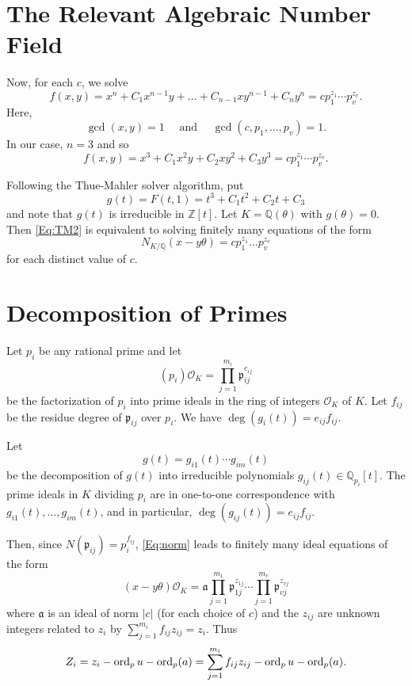 \section{The Relevant Algebraic Number Field}
Now, for each $c$, we solve
\[f(x,y) = x^n + C_1 x^{n-1}y + \dots + C_{n-1}xy^{n-1} + C_ny^n = c p_1^{z_1} \cdots p_v^{z_v}.\]
Here, 
\[\gcd(x,y) = 1 \quad \text{ and } \quad \gcd(c,p_1, \dots, p_v) = 1.\]
In our case, $n = 3$ and so
\[f(x,y) = x^3 + C_1 x^{2}y + C_2xy^2 + C_3y^3 = c p_1^{z_1} \cdots p_v^{z_v}.\]

Following the Thue-Mahler solver algorithm, put
\[g(t) = F(t,1) = t^3 + C_1t^2 + C_2t + C_3\]
and note that $g(t)$ is irreducible in $\mathbb{Z}[t]$. Let $K = \mathbb{Q}(\theta)$ with $g(\theta) = 0$. Then \eqref{Eq:TM2} is equivalent to solving finitely many equations of the form
\begin{equation} \label{Eq:norm}
N_{K/\mathbb{Q}}(x-y\theta) = cp_1^{z_1}\dots p_v^{z_v}
\end{equation}
for each distinct value of $c$. 


\section{Decomposition of Primes}

Let $p_i$ be any rational prime and let 
\[(p_i)\mathcal{O}_K = \prod_{j = 1}^{m_i} \mathfrak{p}_{ij}^{e_{ij}}\]
be the factorization of $p_i$ into prime ideals in the ring of integers $\mathcal{O}_K$ of $K$. Let $f_{ij}$ be the residue degree of $\mathfrak{p}_{ij}$ over $p_i$. We have $\deg(g_i(t)) = e_{ij}f_{ij}$.

Let
\[g(t) = g_{i1}(t)\cdots g_{im}(t)\]
be the decomposition of $g(t)$ into irreducible polynomials $g_{ij}(t) \in \mathbb{Q}_{p_i}[t]$. The prime ideals in $K$ dividing $p_i$ are in one-to-one correspondence with $g_{i1}(t), \dots, g_{im}(t)$, and in particular, $\deg(g_{ij}(t)) = e_{ij}f_{ij}$. 

Then, since $N(\mathfrak{p}_{ij}) = p_i^{f_{ij}}$, \eqref{Eq:norm} leads to finitely many ideal equations of the form
\begin{equation} \label{Eq:ideals}
(x-y\theta)\mathcal{O}_K = \mathfrak{a} \prod_{j = 1}^{m_1} \mathfrak{p}_{1j}^{z_{1j}} \cdots \prod_{j = 1}^{m_v} \mathfrak{p}_{vj}^{z_{vj}}
\end{equation}
where $\mathfrak{a}$ is an ideal of norm $|c|$ (for each choice of $c$) and the $z_{ij}$ are unknown integers related to $z_i$ by $\sum_{j = 1}^{m_i} f_{ij}z_{ij} = z_i $. Thus
\[Z_i = z_i - \operatorname{ord}_p{u} - \operatorname{ord}_p(a) =  \sum_{j = 1}^{m_i} f_{ij}z_{ij} -  \operatorname{ord}_p{u} - \operatorname{ord}_p(a).\]

